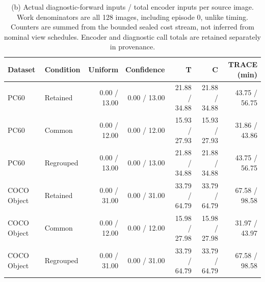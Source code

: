 \begin{table}[t]
\par\medskip
\caption{(b) Actual diagnostic-forward inputs / total encoder inputs per source image. Work denominators are all 128 images, including episode 0, unlike timing. Counters are summed from the bounded sealed cost stream, not inferred from nominal view schedules. Encoder and diagnostic call totals are retained separately in provenance.}
\label{tab:standalone-work}
\centering\small
\begin{tabular}{@{}llrrrrr@{}}
\toprule
Dataset & Condition & Uniform & Confidence & T & C & TRACE (min) \\
\midrule
PC60 & Retained & 0.00 / 13.00 & 0.00 / 13.00 & 21.88 / 34.88 & 21.88 / 34.88 & 43.75 / 56.75 \\
PC60 & Common & 0.00 / 12.00 & 0.00 / 12.00 & 15.93 / 27.93 & 15.93 / 27.93 & 31.86 / 43.86 \\
PC60 & Regrouped & 0.00 / 13.00 & 0.00 / 13.00 & 21.88 / 34.88 & 21.88 / 34.88 & 43.75 / 56.75 \\
COCO Object & Retained & 0.00 / 31.00 & 0.00 / 31.00 & 33.79 / 64.79 & 33.79 / 64.79 & 67.58 / 98.58 \\
COCO Object & Common & 0.00 / 12.00 & 0.00 / 12.00 & 15.98 / 27.98 & 15.98 / 27.98 & 31.97 / 43.97 \\
COCO Object & Regrouped & 0.00 / 31.00 & 0.00 / 31.00 & 33.79 / 64.79 & 33.79 / 64.79 & 67.58 / 98.58 \\
\bottomrule
\end{tabular}
\end{table}
